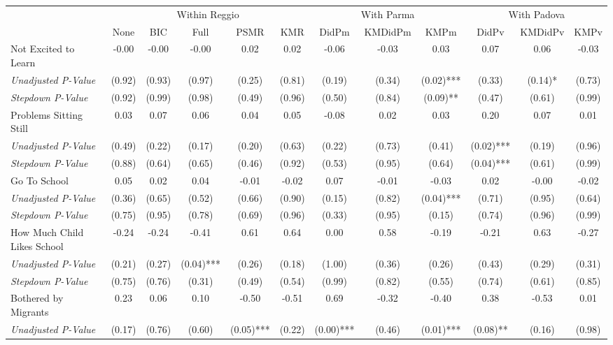 \begin{tabular}{l c c c c c c c c c c c}
\toprule
& \multicolumn{5}{c}{Within Reggio} & \multicolumn{3}{c}{With Parma} & \multicolumn{3}{c}{With Padova} \\\cmidrule(lr){2-6} \cmidrule(lr){7-9} \cmidrule(lr){10-12}
 & None & BIC & Full & PSMR & KMR & DidPm & KMDidPm & KMPm & DidPv & KMDidPv & KMPv \\
\midrule
Not Excited to Learn & -0.00 & -0.00 & -0.00 & 0.02 & 0.02 & -0.06 & -0.03 & 0.03 & 0.07 & 0.06 & -0.03 \\
\quad \textit{Unadjusted P-Value} & (0.92) & (0.93) & (0.97) & (0.25) & (0.81) & (0.19) & (0.34) & (0.02)*** & (0.33) & (0.14)* & (0.73) \\
\quad \textit{Stepdown P-Value} & (0.92) & (0.99) & (0.98) & (0.49) & (0.96) & (0.50) & (0.84) & (0.09)** & (0.47) & (0.61) & (0.99) \\
Problems Sitting Still & 0.03 & 0.07 & 0.06 & 0.04 & 0.05 & -0.08 & 0.02 & 0.03 & 0.20 & 0.07 & 0.01 \\
\quad \textit{Unadjusted P-Value} & (0.49) & (0.22) & (0.17) & (0.20) & (0.63) & (0.22) & (0.73) & (0.41) & (0.02)*** & (0.19) & (0.96) \\
\quad \textit{Stepdown P-Value} & (0.88) & (0.64) & (0.65) & (0.46) & (0.92) & (0.53) & (0.95) & (0.64) & (0.04)*** & (0.61) & (0.99) \\
Go To School & 0.05 & 0.02 & 0.04 & -0.01 & -0.02 & 0.07 & -0.01 & -0.03 & 0.02 & -0.00 & -0.02 \\
\quad \textit{Unadjusted P-Value} & (0.36) & (0.65) & (0.52) & (0.66) & (0.90) & (0.15) & (0.82) & (0.04)*** & (0.71) & (0.95) & (0.64) \\
\quad \textit{Stepdown P-Value} & (0.75) & (0.95) & (0.78) & (0.69) & (0.96) & (0.33) & (0.95) & (0.15) & (0.74) & (0.96) & (0.99) \\
How Much Child Likes School & -0.24 & -0.24 & -0.41 & 0.61 & 0.64 & 0.00 & 0.58 & -0.19 & -0.21 & 0.63 & -0.27 \\
\quad \textit{Unadjusted P-Value} & (0.21) & (0.27) & (0.04)*** & (0.26) & (0.18) & (1.00) & (0.36) & (0.26) & (0.43) & (0.29) & (0.31) \\
\quad \textit{Stepdown P-Value} & (0.75) & (0.76) & (0.31) & (0.49) & (0.54) & (0.99) & (0.82) & (0.55) & (0.74) & (0.61) & (0.85) \\
Bothered by Migrants & 0.23 & 0.06 & 0.10 & -0.50 & -0.51 & 0.69 & -0.32 & -0.40 & 0.38 & -0.53 & 0.01 \\
\quad \textit{Unadjusted P-Value} & (0.17) & (0.76) & (0.60) & (0.05)*** & (0.22) & (0.00)*** & (0.46) & (0.01)*** & (0.08)** & (0.16) & (0.98) \\

\end{tabular}
